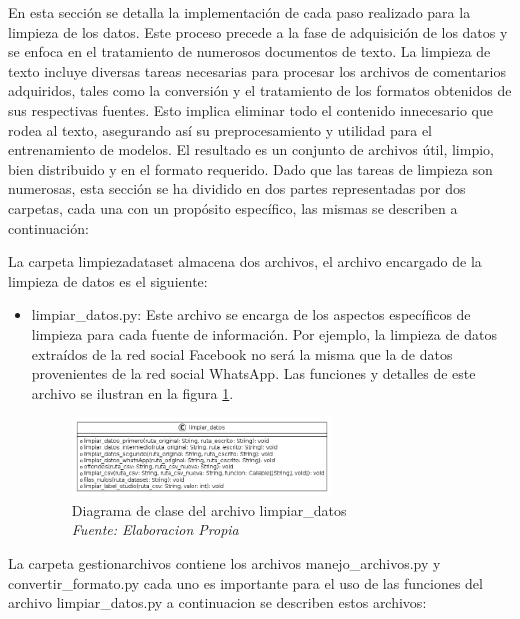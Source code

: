 En esta sección se detalla la implementación de cada paso realizado para la limpieza de los datos. Este proceso precede a la fase de adquisición de los datos y se enfoca en el tratamiento de numerosos documentos de texto. La limpieza de texto incluye diversas tareas necesarias para procesar los archivos de comentarios adquiridos, tales como la conversión y el tratamiento de los formatos obtenidos de sus respectivas fuentes. Esto implica eliminar todo el contenido innecesario que rodea al texto, asegurando así su preprocesamiento y utilidad para el entrenamiento de modelos. El resultado es un conjunto de archivos útil, limpio, bien distribuido y en el formato requerido. Dado que las tareas de limpieza son numerosas, esta sección se ha dividido en dos partes representadas por dos carpetas, cada una con un propósito específico, las mismas se describen a continuación:

La carpeta limpiezadataset almacena dos archivos, el archivo encargado de la limpieza de datos es el siguiente:

\begin{itemize}

\item limpiar\_datos.py: Este archivo se encarga de los aspectos específicos de limpieza para cada fuente de información. Por ejemplo, la limpieza de datos extraídos de la red social Facebook no será la misma que la de datos provenientes de la red social WhatsApp. Las funciones y detalles de este archivo se ilustran en la figura \ref{fig:uml1}.

\begin{figure}[h!]
	\includegraphics[width=0.65\textwidth]{capitulo5/figuras/fig1.png}
	\caption[Diagrama de clase del archivo limpiar\_datos]{Diagrama de clase del archivo limpiar\_datos
		\\\textit{Fuente: Elaboracion Propia}}
	\label{fig:uml1}
\end{figure}

\end{itemize}


La carpeta gestionarchivos contiene los archivos manejo\_archivos.py y convertir\_formato.py cada uno es importante para el uso de las funciones del archivo limpiar\_datos.py a continuacion se describen estos archivos:

